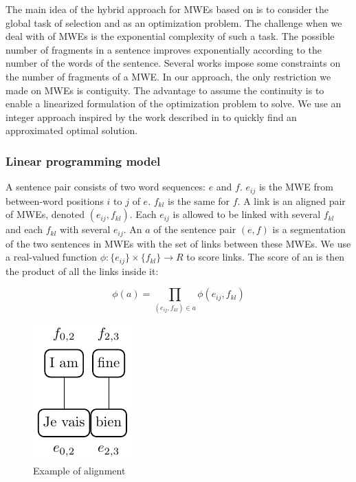 \documentclass[output=paper,modfonts,nonflat]{langsci/langscibook}
\begin{document}
The main idea of the hybrid approach for MWEs  based on  is to consider the global task of selection and  as an optimization problem. 
The challenge when we deal with  of MWEs is the exponential complexity of such a task. 
The possible number of fragments in a sentence improves exponentially according to the number of the words of the sentence. 
Several works impose some constraints on the number of fragments of a MWE. 
In our approach, the only restriction we made on MWEs is contiguity. The advantage to assume the continuity is to enable a linearized formulation of the optimization problem to solve. We use an integer  approach inspired by the work described in \citet{denero2008complexity} to quickly find an approximated optimal solution.

\subsubsection{Linear programming model}\label{sec:semmar:4.3.1}

A sentence pair consists of two word sequences: $e$ and $f$. 
$e_{ij}$ is the MWE from between-word positions $i$ to $j$ of $e$. 
$f_{kl}$ is the same for $f$. 
A link is an aligned pair of MWEs, denoted $(e_{ij},f_{kl})$. 
Each $e_{ij}$ is allowed to be linked with several $f_{kl}$ and each $f_{kl}$ with several $e_{ij}$. 
An  $a$ of the sentence pair $(e,f)$ is a segmentation of the two sentences in MWEs with the set of links between these MWEs.
We use a real-valued function $\phi:\{e_{ij}\}\times\{f_{kl}\}\rightarrow R$ to score links. 
The score of an  is then the product of all the links inside it:

\begin{equation}
\phi(a)=\prod_{(e_{ij},f_{kl})\in a} \phi(e_{ij},f_{kl})
\end{equation}
\begin{figure}
  \includegraphics[scale=1.]{figures/figExSem}
\caption{\label{sem:fig:aliEx}Example of alignment}
\end{figure}
\end{document}
